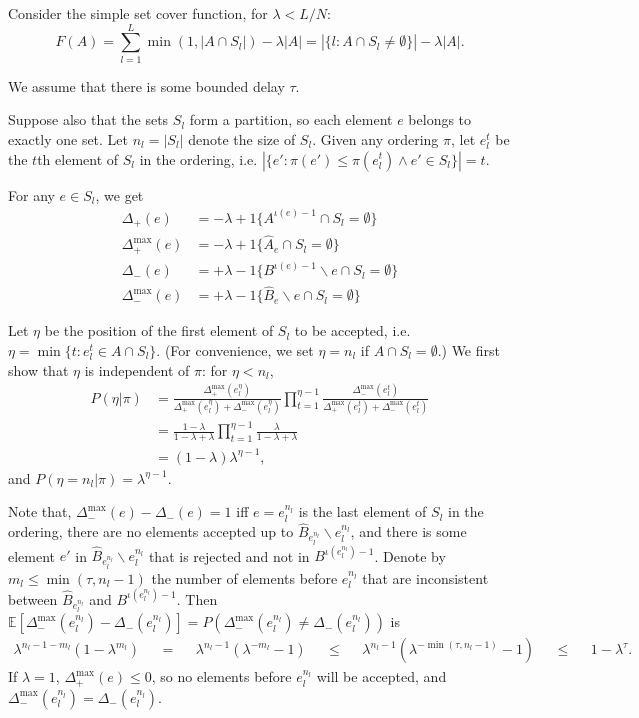 Consider the simple set cover function, for $\lambda < L/N$:
\[ F(A) = \sum_{l=1}^L \min(1,|A\cap S_l|) - \lambda|A| = |\{l: A\cap S_l \neq\emptyset\}| - \lambda|A|.\]

We assume that there is some bounded delay $\tau$.

Suppose also that the sets $S_l$ form a partition, so each element $e$ belongs to exactly one set.
Let $n_l = |S_l|$ denote the size of $S_l$.
Given any ordering $\pi$, let $e_l^t$ be the $t$th element of $S_l$ in the ordering, i.e. $|\{e': \pi(e') \leq \pi(e_l^t) \wedge e'\in S_l\}| = t$.

For any $e \in S_l$, we get 
\begin{align*}
\Delta_+       (e) &= -\lambda + 1\{A^{\iota(e)-1}\cap S_l = \emptyset\}\\
\Delta_+^{\max}(e) &= -\lambda + 1\{\hat{A}_e\cap S_l = \emptyset\}\\
\Delta_-       (e) &= +\lambda - 1\{B^{\iota(e)-1}\backslash e\cap S_l = \emptyset\}\\
\Delta_-^{\max}(e) &= +\lambda - 1\{\hat{B}_e\backslash e\cap S_l = \emptyset\}
\end{align*}

Let $\eta$ be the position of the first element of $S_l$ to be accepted, i.e. $\eta = \min\{t : e_l^t \in A \cap S_l\}$.
(For convenience, we set $\eta = n_l$ if $A \cap S_l = \emptyset$.)
We first show that $\eta$ is independent of $\pi$: for $\eta < n_l$,
\begin{align*}
P(\eta|\pi)
&= \frac{\Delta_+^{\max}(e_l^\eta)}{\Delta_+^{\max}(e_l^\eta) + \Delta_-^{\max}(e_l^\eta)} \prod_{t=1}^{\eta-1} \frac{\Delta_-^{\max}(e_l^t)}{\Delta_+^{\max}(e_l^t) + \Delta_-^{\max}(e_l^t)}\\
&= \frac{1-\lambda}{1-\lambda+\lambda} \prod_{t=1}^{\eta-1} \frac{\lambda}{1-\lambda+\lambda}\\
&= (1-\lambda)\lambda^{\eta-1},
\end{align*}
and $P(\eta=n_l | \pi) = \lambda^{\eta-1}$.

Note that, $\Delta_-^{\max}(e)-\Delta_-(e) = 1$ iff $e=e_l^{n_l}$ is the last element of $S_l$ in the ordering, there are no elements accepted up to $\hat{B}_{e_l^{n_l}}\backslash e_l^{n_l}$, and there is some element $e'$ in $\hat{B}_{e_l^{n_l}}\backslash {e_l^{n_l}}$ that is rejected and not in $B^{\iota(e_l^{n_l})-1}$.
Denote by $m_l \leq \min(\tau,n_l-1)$ the number of elements before $e_l^{n_l}$ that are inconsistent between $\hat{B}_{e_l^{n_l}}$ and $B^{\iota(e_l^{n_l})-1}$.
Then $\mathbb{E}[\Delta_-^{\max}(e_l^{n_l}) - \Delta_-(e_l^{n_l})] = P(\Delta_-^{\max}(e_l^{n_l}) \neq \Delta_-(e_l^{n_l}))$ is
\begin{align*}
\lambda^{n_l-1-m_l}(1-\lambda^{m_l})
&&=&& \lambda^{n_l-1}(\lambda^{-m_l}-1)
&&\leq&& \lambda^{n_l-1}(\lambda^{-\min(\tau,n_l-1)}-1)
&&\leq&& 1 - \lambda^\tau.
\end{align*}
If $\lambda=1$, $\Delta_+^{\max}(e) \leq 0$, so no elements before $e_l^{n_l}$ will be accepted, and $\Delta_-^{\max}(e_l^{n_l}) = \Delta_-(e_l^{n_l})$.

